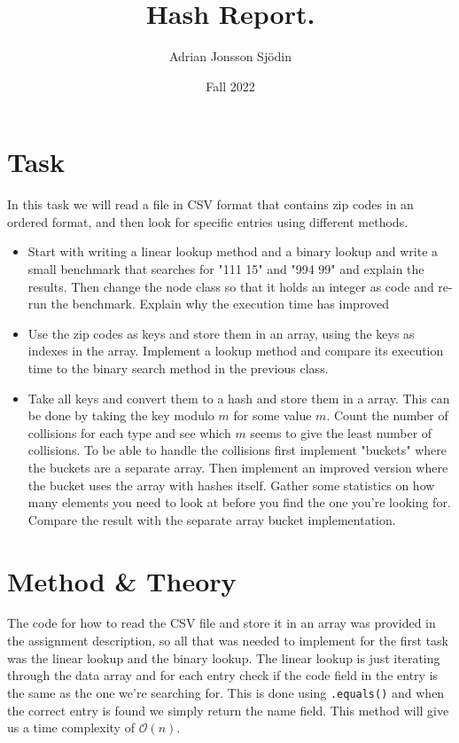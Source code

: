 \documentclass[a4paper,11pt]{article}
\begin{document}
\title{
    \textbf{Hash Report.}
}
\author{Adrian Jonsson Sjödin}
\date{Fall 2022}

\maketitle

\section{Task}
\label{task}
In this task we will read a file in CSV format that contains zip codes in an ordered format,  and then look for specific entries
using different methods.
\begin{itemize}
    \item Start with writing a linear lookup method and a binary lookup and write a small benchmark that searches for "111 15"
          and "994 99" and explain the results. Then change the node class so that it holds an integer as code and re-run the benchmark.
          Explain why the execution time has improved

    \item Use the zip codes as keys and store them in an array, using the keys as indexes in the array. Implement a lookup method and
          compare its execution time to the binary search method in the previous class.

    \item Take all keys and convert them to a hash and store them in a array. This can be done by taking the key modulo $m$ for some
          value $m$. Count the number of collisions for each type and see which $m$ seems to give the least number of collisions. To be able to
          handle the collisions first implement "buckets" where the buckets are a separate array. Then implement an improved version where the
          bucket uses the array with hashes itself. Gather some statistics on how many elements you need to look at before you find the one you're
          looking for. Compare the result with the separate array bucket implementation.

\end{itemize}

\section{Method \& Theory}
\label{method}
The code for how to read the CSV file and store it in an array was provided in the assignment description, so all that was needed to implement for the first task was the linear
lookup and the binary lookup. The linear lookup is just iterating through the data array and for each entry check if the code field in the entry is the same as the one we're
searching for. This is done using {\tt .equals()} and when the correct entry is found we simply return the name field. This method will give us a time complexity of
$\mathcal{O}(n)$.
\end{document}
